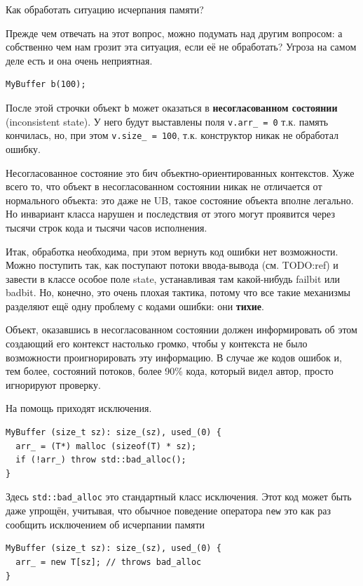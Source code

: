 \documentclass[a4paper,12pt,oneside]{article}
\begin{document}
Как обработать ситуацию исчерпания памяти? 

Прежде чем отвечать на этот вопрос, можно подумать над другим вопросом: а собственно чем нам грозит эта ситуация, если её не обработать? Угроза на самом деле есть и она очень неприятная.

\begin{lstlisting}
MyBuffer b(100);
\end{lstlisting}

После этой строчки объект \lstinline!b! может оказаться в \textbf{несогласованном состоянии} (inconsistent state). У него будут выставлены поля \lstinline!v.arr_ = 0! т.к. память кончилась, но, при этом \lstinline!v.size_ = 100!, т.к. конструктор никак не обработал ошибку. 

Несогласованное состояние это бич объектно-ориентированных контекстов. Хуже всего то, что объект в несогласованном состоянии никак не отличается от нормального объекта: это даже не UB, такое состояние объекта вполне легально. Но инвариант класса нарушен и последствия от этого могут проявится через тысячи строк кода и тысячи часов исполнения.

Итак, обработка необходима, при этом вернуть код ошибки нет возможности. Можно поступить так, как поступают потоки ввода-вывода (см. TODO:ref) и завести в классе особое поле state, устанавливая там какой-нибудь failbit или badbit. Но, конечно, это очень плохая тактика, потому что все такие механизмы разделяют ещё одну проблему с кодами ошибки: они \textbf{тихие}.

Объект, оказавшись в несогласованном состоянии должен информировать об этом создающий его контекст настолько громко, чтобы у контекста не было возможности проигнорировать эту информацию. В случае же кодов ошибок и, тем более, состояний потоков, более 90\% кода, который видел автор, просто игнорируют проверку.

На помощь приходят исключения.

\begin{lstlisting}
MyBuffer (size_t sz): size_(sz), used_(0) {
  arr_ = (T*) malloc (sizeof(T) * sz);
  if (!arr_) throw std::bad_alloc();
}
\end{lstlisting}

Здесь \lstinline!std::bad_alloc! это стандартный класс исключения. Этот код может быть даже упрощён, учитывая, что обычное поведение оператора \lstinline!new! это как раз сообщить исключением об исчерпании памяти

\begin{lstlisting}
MyBuffer (size_t sz): size_(sz), used_(0) {
  arr_ = new T[sz]; // throws bad_alloc
}
\end{lstlisting}
\end{document}
